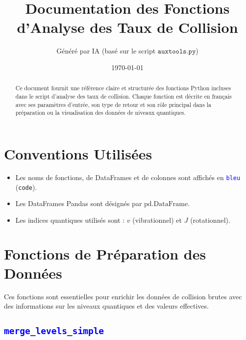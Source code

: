 \documentclass{article}
\title{\textbf{Documentation des Fonctions d'Analyse des Taux de Collision} \vspace{0.5em}}
\author{Généré par IA (basé sur le script $\texttt{auxtools.py}$)}
\date{\today}
\newcommand{\code}[1]{\texttt{\textcolor{blue}{#1}}}
\begin{document}
\maketitle
\thispagestyle{empty}

\begin{abstract}
Ce document fournit une référence claire et structurée des fonctions Python incluses dans le script d'analyse des taux de collision. Chaque fonction est décrite en français avec ses paramètres d'entrée, son type de retour et son rôle principal dans la préparation ou la visualisation des données de niveaux quantiques.
\end{abstract}

\vspace{1em}

\tableofcontents
\newpage

\section{Conventions Utilisées}

\begin{itemize}
    \item Les noms de fonctions, de DataFrames et de colonnes sont affichés en \code{bleu} (\texttt{code}).
    \item Les DataFrames Pandas sont désignés par $\text{pd.DataFrame}$.
    \item Les indices quantiques utilisés sont : $v$ (vibrationnel) et $J$ (rotationnel).
\end{itemize}

\section{Fonctions de Préparation des Données}

Ces fonctions sont essentielles pour enrichir les données de collision brutes avec des informations sur les niveaux quantiques et des valeurs effectives.

\subsection{\code{merge\_levels\_simple}}
\end{document}
